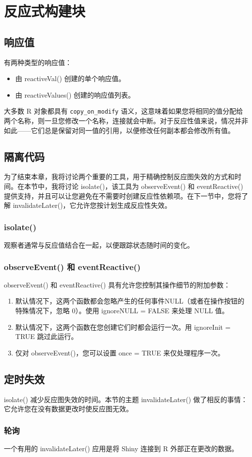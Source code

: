 \chapter{反应式构建块\label{ch15}}
\section{响应值}
有两种类型的响应值：
\begin{itemize}
    \item 由 reactiveVal() 创建的单个响应值。
    \item 由 reactiveValues() 创建的响应值列表。
\end{itemize}

大多数 R 对象都具有 \verb|copy_on_modify| 语义，这意味着如果您将相同的值分配给两个名称，则一旦您修改一个名称，连接就会中断。对于反应性值来说，情况并非如此——它们总是保留对同一值的引用，以便修改任何副本都会修改所有值。
\section{隔离代码}
为了结束本章，我将讨论两个重要的工具，用于精确控制反应图失效的方式和时间。在本节中，我将讨论 isolate()，该工具为 observeEvent() 和 eventReactive() 提供支持，并且可以让您避免在不需要时创建反应性依赖项。在下一节中，您将了解 invalidateLater()，它允许您按计划生成反应性失效。
\subsection{isolate()}
观察者通常与反应值结合在一起，以便跟踪状态随时间的变化。
\subsection{observeEvent() 和 eventReactive()}
observeEvent() 和 eventReactive() 具有允许您控制其操作细节的附加参数：
\begin{enumerate}
    \item 默认情况下，这两个函数都会忽略产生的任何事件NULL（或者在操作按钮的特殊情况下，忽略 0）。使用 ignoreNULL = FALSE 来处理 NULL 值。
    \item 默认情况下，这两个函数在您创建它们时都会运行一次。用 ignoreInit = TRUE 跳过此运行。
    \item 仅对 observeEvent()，您可以设置 once = TRUE 来仅处理程序一次。
\end{enumerate}
\section{定时失效}
isolate() 减少反应图失效的时间。本节的主题 invalidateLater() 做了相反的事情：它允许您在没有数据更改时使反应图无效。
\subsection{轮询}
一个有用的 invalidateLater() 应用是将 Shiny 连接到 R 外部正在更改的数据。